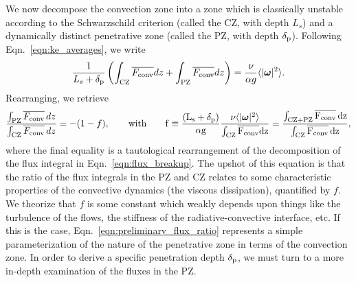 \documentclass{aastex631}
\newcommand{\delp}{\ensuremath{\delta_{\rm{p}}}}
\newcommand{\Fconv}{\ensuremath{F_{\rm{conv}}}}
\newcommand{\angles}[1]{\langle #1 \rangle}
\renewcommand{\vec}[1]{\boldsymbol{#1}}
\renewcommand{\bar}[1]{\overline{#1}}
\begin{document}
We now decompose the convection zone into a zone which is classically unstable according to the Schwarzschild criterion (called the CZ, with depth $L_s$) and a dynamically distinct penetrative zone (called the PZ, with depth $\delp$).
Following Eqn.~\ref{eqn:ke_averages}, we write
\begin{equation}
\frac{1}{L_s + \delp}\left(\int_{\rm{CZ}} \bar{\Fconv} dz + \int_{\rm{PZ}} \bar{\Fconv} dz \right) = \frac{\nu}{\alpha g} \angles{|\vec{\omega}|^2}.
\label{eqn:flux_breakup}
\end{equation}
Rearranging, we retrieve 
\begin{equation}
\frac{\int_{\rm{PZ}}\bar{\Fconv}\,dz}{\int_{\rm{CZ}}\bar{\Fconv}\,dz} = -(1 - f),
\qquad\rm{with}\qquad
f \equiv \frac{(L_s + \delp)}{\alpha g} \frac{\nu\angles{|\vec{\omega}|^2}}{\int_{\rm{CZ}} \bar{\Fconv} dz}
= \frac{\int_{\rm{CZ+PZ}}\bar{\Fconv}\,dz}{\int_{\rm{CZ}}\bar{\Fconv}\,dz},
\label{eqn:preliminary_flux_ratio}
\end{equation}
where the final equality is a tautological rearrangement of the decomposition of the flux integral in Eqn.~\ref{eqn:flux_breakup}.
The upshot of this equation is that the ratio of the flux integrals in the PZ and CZ relates to some characteristic properties of the convective dynamics (the viscous dissipation), quantified by $f$.
We theorize that $f$ is some constant which weakly depends upon things like the turbulence of the flows, the stiffness of the radiative-convective interface, etc.
If this is the case, Eqn.~\ref{eqn:preliminary_flux_ratio} represents a simple parameterization of the nature of the penetrative zone in terms of the convection zone.
In order to derive a specific penetration depth $\delp$, we must turn to a more in-depth examination of the fluxes in the PZ.
\end{document}
